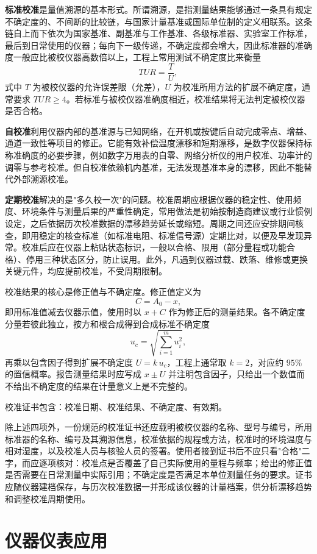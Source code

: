 \textbf{标准校准}是量值溯源的基本形式。所谓溯源，是指测量结果能够通过一条具有规定不确定度的、不间断的比较链，与国家计量基准或国际单位制的定义相联系。这条链自上而下依次为国家基准、副基准与工作基准、各级标准器、实验室工作标准，最后到日常使用的仪器；每向下一级传递，不确定度都会增大，因此标准器的准确度一般应比被校仪器高数倍以上，工程上常用测试不确定度比来衡量
\[
TUR = \frac{T}{U},
\]
式中 $T$ 为被校仪器的允许误差限（允差），$U$ 为校准所用方法的扩展不确定度，通常要求 $TUR \ge 4$。若标准与被校仪器准确度相近，校准结果将无法判定被校仪器是否合格。

\textbf{自校准}利用仪器内部的基准源与已知网络，在开机或按键后自动完成零点、增益、通道一致性等项目的修正。它能有效补偿温度漂移和短期漂移，是数字仪器保持标称准确度的必要步骤，例如数字万用表的自零、网络分析仪的用户校准、功率计的调零与参考校准。但自校准依赖机内基准，无法发现基准本身的漂移，因此不能替代外部溯源校准。

\textbf{定期校准}解决的是"多久校一次"的问题。校准周期应根据仪器的稳定性、使用频度、环境条件与测量后果的严重性确定，常用做法是初始按制造商建议或行业惯例设定，之后依据历次校准数据的漂移趋势延长或缩短。周期之间还应安排期间核查，即用稳定的核查标准（如标准电阻、标准信号源）定期比对，以便及早发现异常。校准后应在仪器上粘贴状态标识，一般以合格、限用（部分量程或功能合格）、停用三种状态区分，防止误用。此外，凡遇到仪器过载、跌落、维修或更换关键元件，均应提前校准，不受周期限制。

校准结果的核心是修正值与不确定度。修正值定义为
\[
C = A_0 - x,
\]
即用标准值减去仪器示值，使用时以 $x + C$ 作为修正后的测量结果。各不确定度分量若彼此独立，按方和根合成得到合成标准不确定度
\[
u_c = \sqrt{\sum_{i=1}^{m} u_i^2},
\]
再乘以包含因子得到扩展不确定度 $U = k\,u_c$，工程上通常取 $k = 2$，对应约 $95\%$ 的置信概率。报告测量结果时应写成 $x \pm U$ 并注明包含因子，只给出一个数值而不给出不确定度的结果在计量意义上是不完整的。

校准证书包含：校准日期、校准结果、不确定度、有效期。

除上述四项外，一份规范的校准证书还应载明被校仪器的名称、型号与编号，所用标准器的名称、编号及其溯源信息，校准依据的规程或方法，校准时的环境温度与相对湿度，以及校准人员与核验人员的签署。使用者接到证书后不应只看"合格"二字，而应逐项核对：校准点是否覆盖了自己实际使用的量程与频率；给出的修正值是否需要在日常测量中实际引用；不确定度是否满足本单位测量任务的要求。证书应随仪器建档保存，与历次校准数据一并形成该仪器的计量档案，供分析漂移趋势和调整校准周期使用。

\section{仪器仪表应用}
\label{sec:instruments_applications}

